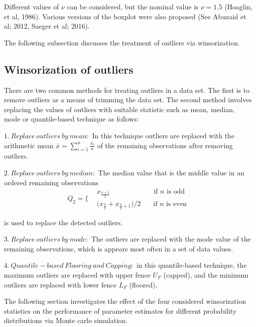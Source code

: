 \documentclass[
]{article}
\begin{document}
Different values of \(\nu\) can be considered, but the nominal value is
\(\nu=1.5\) (Hoaglin, et al, 1986). Various versions of the boxplot were
also proposed (See Abuzaid et al; 2012, Saeger et al; 2016).

The following subsection discusses the treatment of outliers via
winsorization.

\hypertarget{winsorization-of-outliers}{%
\subsection{Winsorization of outliers}\label{winsorization-of-outliers}}

There are two common methods for treating outliers in a data set. The
first is to remove outliers as a means of trimming the data set. The
second method involves replacing the values of outliers with suitable
statistic such as mean, median, mode or quantile-based technique as
follows:

\(1.\ Replace\ outliers\ by\ mean:\) In this technique outliers are
replaced with the arithmetic mean \(\bar{x}=\sum_{i=1}^n \frac{x_i}{n}\)
of the remaining observations after removing outliers.

\(2.\ Replace\ outliers\ by\ median:\) The median value that is the
middle value in an ordered remaining observations
\[Q_2 =\bigg\{ \begin{aligned} 
 &x_{\frac {n+1}{2}}  \,\,\,\,\,\,\,\,\,\,\,\,\,\,\,\,\,\,\,\,\,\,\,\,\,\,\,\,\,\,\,\,\,\,\,\,\,\, \text{if $n$ is odd}  \nonumber\\   
 &\big(x_{\frac {n}{2}} + x_{\frac {n}{2}+1} \big)/2 \,\,\,\,\,\,\,\,\,\,\, \text{if $n$ is even} \nonumber
\end{aligned}\]

is used to replace the detected outliers.

\(3.\ Replace \ outliers \ by \ mode:\) The outliers are replaced with
the mode value of the remaining observations, which is appears most
often in a set of data values.

\(4.\ Quantile-based \ Flooring \ and \ Capping:\) in this
quantile-based technique, the maximum outliers are replaced with upper
fence \(U_F\) (capped), and the minimum outliers are replaced with lower
fence \(L_F\) (floored).

The following section investigates the effect of the four considered
winsorization statistics on the performance of parameter estimates for
different probability distributions via Monte carlo simulation.
\end{document}
